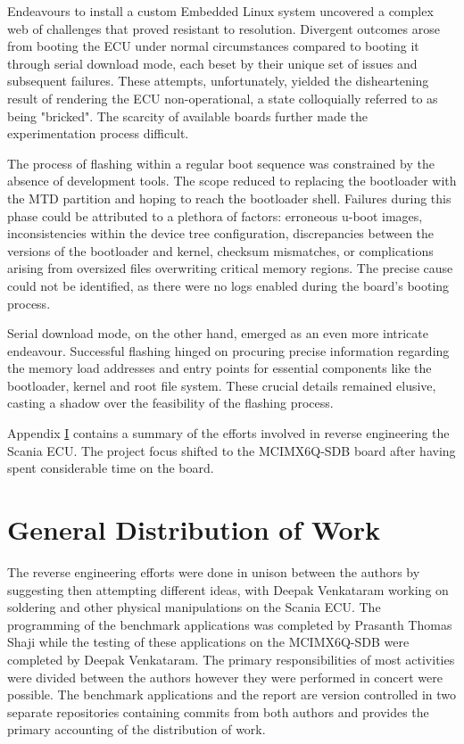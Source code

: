 Endeavours to install a custom Embedded Linux system uncovered a complex web of challenges that proved resistant to resolution. Divergent outcomes arose from booting the ECU under normal circumstances compared to booting it through serial download mode, each beset by their unique set of issues and subsequent failures. These attempts, unfortunately, yielded the disheartening result of rendering the  ECU non-operational, a state colloquially referred to as being "bricked". The scarcity of available boards further made the experimentation process difficult.

The process of flashing within a regular boot sequence was constrained by the absence of development tools. The scope reduced to replacing the bootloader with the MTD partition and hoping to reach the bootloader shell. Failures during this phase could be attributed to a plethora of factors: erroneous u-boot images, inconsistencies within the device tree configuration, discrepancies between the versions of the bootloader and kernel, checksum mismatches, or complications arising from oversized files overwriting critical memory regions. The precise cause could not be identified, as there were no logs enabled during the board's booting process.

Serial download mode, on the other hand, emerged as an even more intricate endeavour. Successful flashing hinged on procuring precise information regarding the memory load addresses and entry points for essential components like the bootloader, kernel and root file system. These crucial details remained elusive, casting a shadow over the feasibility of the flashing process.

Appendix \hyperref[rtc-c300]{I} contains a summary of the efforts involved in reverse engineering the Scania ECU. The project focus shifted to the MCIMX6Q-SDB board after having spent considerable time on the board.

\section{General Distribution of Work}

The reverse engineering efforts were done in unison between the authors by suggesting then attempting different ideas, with Deepak Venkataram working on soldering and other physical manipulations on the Scania ECU. The programming of the benchmark applications was completed by Prasanth Thomas Shaji while the testing of these applications on the MCIMX6Q-SDB were completed by Deepak Venkataram. The primary responsibilities of most activities were divided between the authors however they were performed in concert were possible. The benchmark applications and the report are version controlled in two separate repositories containing commits from both authors and provides the primary accounting of the distribution of work.

